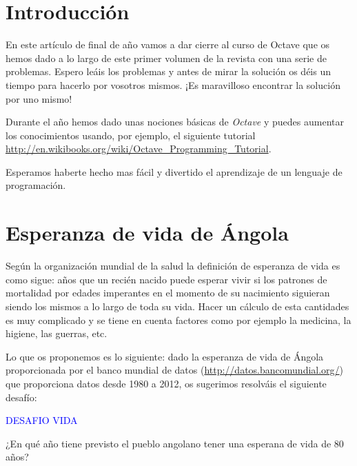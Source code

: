 \section*{Introducción}

En este artículo de final de año vamos a dar cierre al curso de Octave
que os hemos dado a lo largo de este primer volumen de la revista con
una serie de problemas. Espero leáis los problemas y antes de mirar la solución os déis un tiempo
para hacerlo por vosotros mismos. ¡Es maravilloso encontrar la solución
por uno mismo!

Durante el año hemos dado unas nociones básicas de \emph{Octave} y
puedes aumentar los conocimientos usando, por ejemplo, el siguiente
tutorial
\url{http://en.wikibooks.org/wiki/Octave_Programming_Tutorial}.

Esperamos haberte hecho mas fácil y divertido el aprendizaje de un lenguaje de programación.

\section{Esperanza de vida de Ángola}
 
Según la organización mundial de la salud la definición de esperanza
de vida es como sigue: años que un recién nacido puede esperar vivir
si los patrones de mortalidad por edades imperantes en el momento de
su nacimiento siguieran siendo los mismos a lo largo de toda su
vida. Hacer un cálculo de esta cantidades es muy complicado y se tiene
en cuenta factores como por ejemplo la medicina, la higiene, las
guerras, etc.

Lo que os proponemos es lo siguiente: dado la esperanza de vida de
Ángola proporcionada por el banco mundial de datos
(\url{http://datos.bancomundial.org/}) que proporciona datos desde 1980 a
2012, os sugerimos resolváis el siguiente desafío:

\begin{mybox}
  \begin{center}\textcolor{blue}{DESAFIO VIDA}\end{center}
  ¿En qué año tiene previsto el pueblo angolano tener una
  esperana de vida de 80 años?%
\end{mybox}


